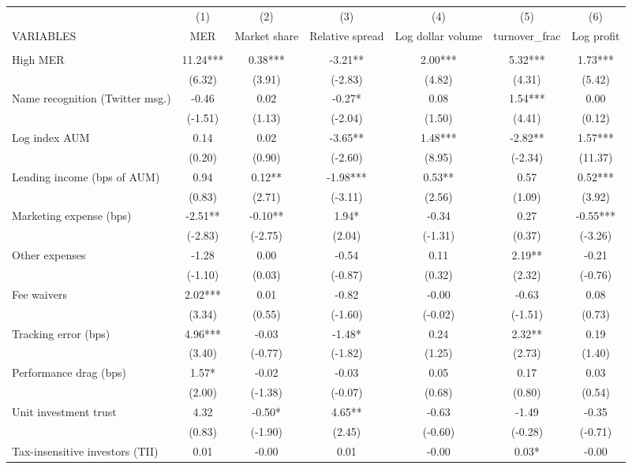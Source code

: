 \documentclass[]{article}
\begin{document}
\begin{tabular}{lcccccc} \hline
 & (1) & (2) & (3) & (4) & (5) & (6) \\
VARIABLES & MER & Market share & Relative spread & Log dollar volume & turnover\_frac & Log profit \\ \hline
 &  &  &  &  &  &  \\
High MER & 11.24*** & 0.38*** & -3.21** & 2.00*** & 5.32*** & 1.73*** \\
 & (6.32) & (3.91) & (-2.83) & (4.82) & (4.31) & (5.42) \\
Name recognition (Twitter msg.) & -0.46 & 0.02 & -0.27* & 0.08 & 1.54*** & 0.00 \\
 & (-1.51) & (1.13) & (-2.04) & (1.50) & (4.41) & (0.12) \\
Log index AUM & 0.14 & 0.02 & -3.65** & 1.48*** & -2.82** & 1.57*** \\
 & (0.20) & (0.90) & (-2.60) & (8.95) & (-2.34) & (11.37) \\
Lending income (bps of AUM) & 0.94 & 0.12** & -1.98*** & 0.53** & 0.57 & 0.52*** \\
 & (0.83) & (2.71) & (-3.11) & (2.56) & (1.09) & (3.92) \\
Marketing expense (bps) & -2.51** & -0.10** & 1.94* & -0.34 & 0.27 & -0.55*** \\
 & (-2.83) & (-2.75) & (2.04) & (-1.31) & (0.37) & (-3.26) \\
Other expenses & -1.28 & 0.00 & -0.54 & 0.11 & 2.19** & -0.21 \\
 & (-1.10) & (0.03) & (-0.87) & (0.32) & (2.32) & (-0.76) \\
Fee waivers & 2.02*** & 0.01 & -0.82 & -0.00 & -0.63 & 0.08 \\
 & (3.34) & (0.55) & (-1.60) & (-0.02) & (-1.51) & (0.73) \\
Tracking error (bps) & 4.96*** & -0.03 & -1.48* & 0.24 & 2.32** & 0.19 \\
 & (3.40) & (-0.77) & (-1.82) & (1.25) & (2.73) & (1.40) \\
Performance drag (bps) & 1.57* & -0.02 & -0.03 & 0.05 & 0.17 & 0.03 \\
 & (2.00) & (-1.38) & (-0.07) & (0.68) & (0.80) & (0.54) \\
Unit investment trust & 4.32 & -0.50* & 4.65** & -0.63 & -1.49 & -0.35 \\
 & (0.83) & (-1.90) & (2.45) & (-0.60) & (-0.28) & (-0.71) \\
Tax-insensitive investors (TII) & 0.01 & -0.00 & 0.01 & -0.00 & 0.03* & -0.00 \\

\end{tabular}
\end{document}
